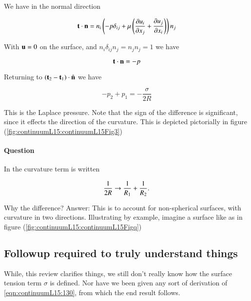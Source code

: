 We have in the normal direction

\begin{equation}\label{eqn:continuumL15:10}
\Bt \cdot \Bn 
=
n_i \left( 
-p \delta_{ij} + \mu \left( 
\PD{x_j}{u_i}
+\PD{x_i}{u_j}
\right)
\right) n_j
\end{equation}

With $\Bu = 0$ on the surface, and $n_i \delta_{ij} n_j = n_j n_j = 1$ we have

\begin{equation}\label{eqn:continuumL15:30}
\Bt \cdot \Bn = -p
\end{equation}

Returning to $(\Bt_2 - \Bt_1) \cdot \ncap$ we have

\begin{equation}\label{eqn:continuumL15:50}
\boxed{
-p_2 + p_1 = -\frac{\sigma}{2 R} 
}
\end{equation}

This is the Laplace pressure.  Note that the sign of the difference is significant, since it effects the direction of the curvature.  This is depicted pictorially in figure (\ref{fig:continuumL15:continuumL15Fig3})

\paragraph{Question} In \citep{landau1987course} the curvature term is written

\begin{equation}\label{eqn:continuumL15:70}
\inv{2 R} \rightarrow \inv{R_1} + \inv{R_2}.
\end{equation}

Why the difference?  Answer: This is to account for non-spherical surfaces, with curvature in two directions.  Illustrating by example, imagine a surface like as in figure (\ref{fig:continuumL15:continuumL15Figq})

\subsection{Followup required to truly understand things}

While, this review clarifies things, we still don't really know how the surface tension term $\sigma$ is defined.  Nor have we been given any sort of derivation of \ref{eqn:continuumL15:130}, from which the end result follows.

